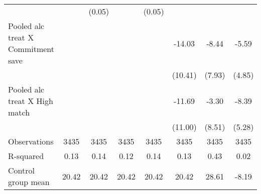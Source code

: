 \begin{tabular}{l c c c c c c c}
                    &            &      (0.05)&            &      (0.05)&            &            &            \\
\addlinespace
Pooled alc treat X Commitment save&            &            &            &            &      -14.03&       -8.44&       -5.59\\
                    &            &            &            &            &     (10.41)&      (7.93)&      (4.85)\\
\addlinespace
Pooled alc treat X High match&            &            &            &            &      -11.69&       -3.30&       -8.39\\
                    &            &            &            &            &     (11.00)&      (8.51)&      (5.28)\\
\midrule
Observations        &        3435&        3435&        3435&        3435&        3435&        3435&        3435\\
R-squared           &        0.13&        0.14&        0.12&        0.14&        0.13&        0.43&        0.02\\
Control group mean  &       20.42&       20.42&       20.42&       20.42&       20.42&       28.61&       -8.19\\
\bottomrule \end{tabular} 